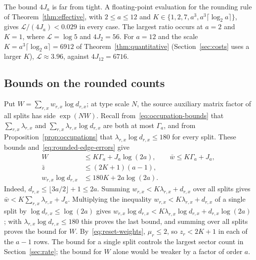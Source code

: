 \begin{remark}\label{rem:observed-loss}
The bound \(4J_a\) is far from tight. A floating-point evaluation for the
rounding rule of Theorem~\ref{thm:effective}, with \(2\le a\le12\) and
\(K\in\{1,2,7,a^3,a^3\lceil\log_2a\rceil\}\), gives
\(\mathcal L/(4J_a)<0.029\) in every case. The largest ratio occurs at
\(a=2\) and \(K=1\), where \(\mathcal L=\log5\) and \(4J_2=56\). For
\(a=12\) and the scale \(K=a^3\lceil\log_2a\rceil=6912\) of
Theorem~\ref{thm:quantitative} (Section~\ref{sec:costs} uses a larger
\(K\)), \(\mathcal L\approx3.96\), against \(4J_{12}=6716\).
\end{remark}

\subsection{Bounds on the rounded counts}
\label{subsec:count-bounds}

Put \(W=\sum_{r,x}w_{r,x}\log d_{r,x}\); at type scale \(N\), the source
auxiliary matrix factor of all splits has side \(\exp(NW)\). Recall
from~\eqref{eq:occupation-bounds} that \(\sum_{r,x}\lambda_{r,x}\) and
\(\sum_{r,x}\lambda_{r,x}\log d_{r,x}\) are both at most \(\Gamma_a\), and
from Proposition~\ref{prop:occupations} that
\(\lambda_{r,x}\log d_{r,x}\le180\) for every split. These bounds
and~\eqref{eq:rounded-edge-errors} give
\begin{equation}\label{eq:rounded-count-bounds}
 \begin{split}
 W&\le K\Gamma_a+J_a\log(2a),\qquad \bar w\le K\Gamma_a+J_a,\\
 \bar z&\le(2K+1)(a-1),\\
 w_{r,x}\log d_{r,x}&\le180K+2a\log(2a).
 \end{split}
\end{equation}
Indeed, \(d_{r,x}\le\lfloor3a/2\rfloor+1\le2a\). Summing
\(w_{r,x}<K\lambda_{r,x}+d_{r,x}\) over all splits gives
\(\bar w<K\sum_{r,x}\lambda_{r,x}+J_a\). Multiplying the inequality \(w_{r,x}<K\lambda_{r,x}+d_{r,x}\) of a single
split by \(\log d_{r,x}\le\log(2a)\) gives
\(w_{r,x}\log d_{r,x}<K\lambda_{r,x}\log d_{r,x}+d_{r,x}\log(2a)\); with
\(\lambda_{r,x}\log d_{r,x}\le180\) this proves the last bound, and summing
over all splits proves the bound for \(W\). By~\eqref{eq:reset-weights},
\(\mu_r\le2\), so \(z_r<2K+1\) in each of the \(a-1\) rows. The bound for a
single split controls the largest sector count in Section~\ref{sec:rate};
the bound for \(W\) alone would be weaker by a factor of order \(a\).
